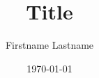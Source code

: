 \documentclass[english,twoside,paras,astro-track, two-supervisors]{HYthesisPhysics}
\title{Title}
\author{Firstname Lastname}
\date{\today}
\begin{document}
\frontmatter
\maketitle



\myquote




\mytableofcontents


\mainmatter

\end{document}

